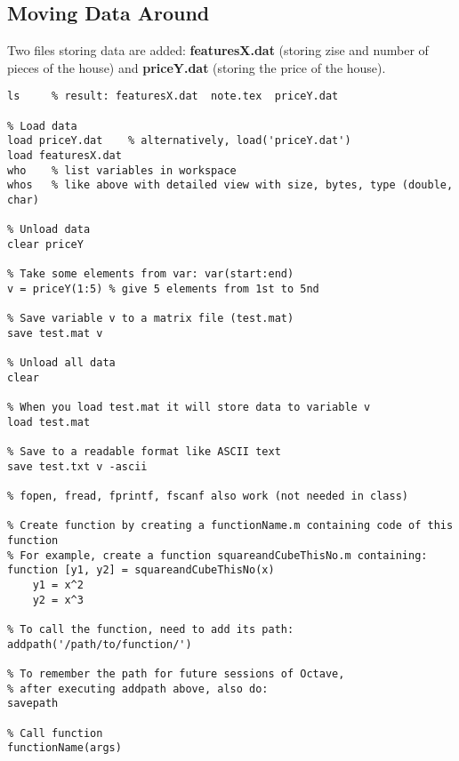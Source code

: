 \subsection{Moving Data Around}
Two files storing data are added: \textbf{featuresX.dat} (storing zise and number of pieces of the house) and \textbf{priceY.dat} (storing the price of the house). 
\begin{lstlisting}[label=lst:dataManip,caption=Moving Data Around]
% Change directory to week2 and list files in there
ls     % result: featuresX.dat  note.tex  priceY.dat 

% Load data
load priceY.dat    % alternatively, load('priceY.dat')
load featuresX.dat
who    % list variables in workspace
whos   % like above with detailed view with size, bytes, type (double, char) 

% Unload data
clear priceY

% Take some elements from var: var(start:end)
v = priceY(1:5) % give 5 elements from 1st to 5nd

% Save variable v to a matrix file (test.mat) 
save test.mat v

% Unload all data
clear 

% When you load test.mat it will store data to variable v
load test.mat

% Save to a readable format like ASCII text
save test.txt v -ascii

% fopen, fread, fprintf, fscanf also work (not needed in class)

% Create function by creating a functionName.m containing code of this function
% For example, create a function squareandCubeThisNo.m containing:
function [y1, y2] = squareandCubeThisNo(x)
    y1 = x^2
    y2 = x^3

% To call the function, need to add its path:
addpath('/path/to/function/')

% To remember the path for future sessions of Octave,
% after executing addpath above, also do:
savepath

% Call function
functionName(args)
\end{lstlisting}

